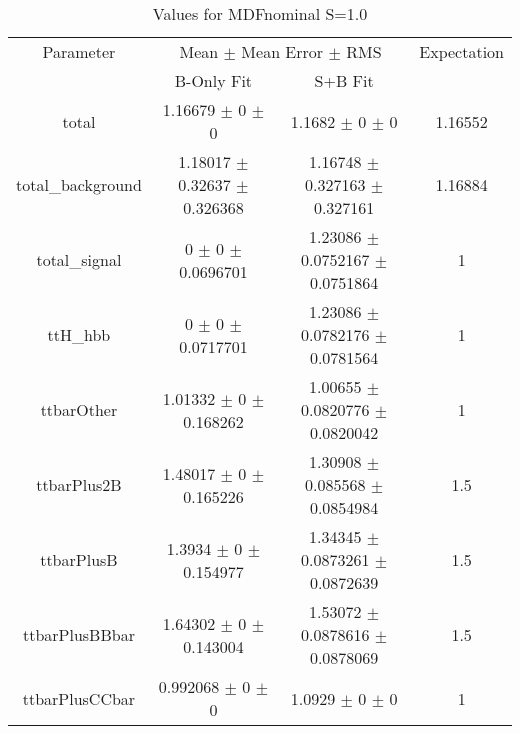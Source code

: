 \begin{table}
\centering
\caption{Values for MDFnominal S=1.0}
\begin{tabular}{cccc}
\toprule
Parameter & \multicolumn{2}{c}{Mean $\pm$ Mean Error $\pm$ RMS} & Expectation\\
 & B-Only Fit & S+B Fit & \\
\midrule
total & \num{1.16679} $\pm$ \num{0} $\pm$ \num{0} & \num{1.1682} $\pm$ \num{0} $\pm$ \num{0} & \num{1.16552}\\
total\_background & \num{1.18017} $\pm$ \num{0.32637} $\pm$ \num{0.326368} & \num{1.16748} $\pm$ \num{0.327163} $\pm$ \num{0.327161} & \num{1.16884}\\
total\_signal & \num{0} $\pm$ \num{0} $\pm$ \num{0.0696701} & \num{1.23086} $\pm$ \num{0.0752167} $\pm$ \num{0.0751864} & \num{1}\\
ttH\_hbb & \num{0} $\pm$ \num{0} $\pm$ \num{0.0717701} & \num{1.23086} $\pm$ \num{0.0782176} $\pm$ \num{0.0781564} & \num{1}\\
ttbarOther & \num{1.01332} $\pm$ \num{0} $\pm$ \num{0.168262} & \num{1.00655} $\pm$ \num{0.0820776} $\pm$ \num{0.0820042} & \num{1}\\
ttbarPlus2B & \num{1.48017} $\pm$ \num{0} $\pm$ \num{0.165226} & \num{1.30908} $\pm$ \num{0.085568} $\pm$ \num{0.0854984} & \num{1.5}\\
ttbarPlusB & \num{1.3934} $\pm$ \num{0} $\pm$ \num{0.154977} & \num{1.34345} $\pm$ \num{0.0873261} $\pm$ \num{0.0872639} & \num{1.5}\\
ttbarPlusBBbar & \num{1.64302} $\pm$ \num{0} $\pm$ \num{0.143004} & \num{1.53072} $\pm$ \num{0.0878616} $\pm$ \num{0.0878069} & \num{1.5}\\
ttbarPlusCCbar & \num{0.992068} $\pm$ \num{0} $\pm$ \num{0} & \num{1.0929} $\pm$ \num{0} $\pm$ \num{0} & \num{1}\\
\bottomrule
\end{tabular}
\end{table}